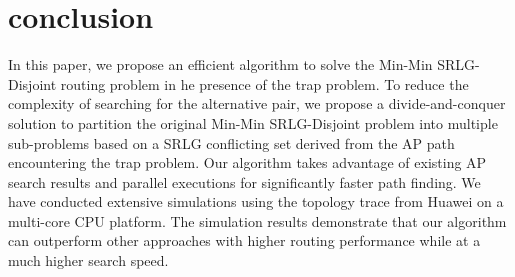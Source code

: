 \section{conclusion}
\label{sec:conclusion}
In this paper, we propose an efficient algorithm to solve the Min-Min  SRLG-Disjoint routing problem in he presence of the trap problem. To reduce the complexity of searching for the alternative pair, we propose a divide-and-conquer solution to partition the original Min-Min SRLG-Disjoint problem into multiple sub-problems based on a SRLG conflicting set derived from the AP path encountering the trap problem. Our algorithm takes advantage of existing AP search results and parallel executions for significantly faster path finding.
We have conducted extensive simulations  using the topology trace from Huawei on a multi-core CPU platform. The simulation results demonstrate that our algorithm can outperform other approaches with higher routing performance while at a much higher search speed.